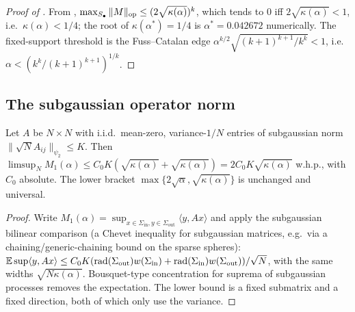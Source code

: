 \begin{proof}[Proof of ]
From , $\max_{S_\bullet}\|M\|_{\mathrm{op}}\le(2\sqrt{\kappa(\alpha)})^k$, which tends to $0$ iff
$2\sqrt{\kappa(\alpha)}<1$, i.e.\ $\kappa(\alpha)<1/4$; the root of $\kappa(\alpha^*)=1/4$ is
$\alpha^*=0.042672$ numerically. The fixed-support threshold is the Fuss--Catalan edge
$\alpha^{k/2}\sqrt{(k+1)^{k+1}/k^k}<1$, i.e.\ $\alpha<(k^k/(k+1)^{k+1})^{1/k}$.
\end{proof}

\subsection{The subgaussian operator norm}
\begin{lemma}\label{lem:subg}
Let $A$ be $N\times N$ with i.i.d.\ mean-zero, variance-$1/N$ entries of subgaussian norm $\|\sqrt N A_{ij}\|_{\psi_2}\le K$.
Then $\limsup_N M_1(\alpha)\le C_0K(\sqrt{\kappa(\alpha)}+\sqrt{\kappa(\alpha)})=2C_0K\sqrt{\kappa(\alpha)}$
w.h.p., with $C_0$ absolute. The lower bracket $\max\{2\sqrt\alpha,\sqrt{\kappa(\alpha)}\}$ is unchanged
and universal.
\end{lemma}
\begin{proof}
Write $M_1(\alpha)=\sup_{x\in\Sigma_{\mathrm{in}},y\in\Sigma_{\mathrm{out}}}\langle y,Ax\rangle$ and apply
the subgaussian bilinear comparison (a Chevet inequality for subgaussian matrices, e.g.\ via a
chaining/generic-chaining bound on the sparse spheres): $\mathbb{E}\sup\langle y,Ax\rangle\le C_0K(\mathrm{rad}(\Sigma_{\mathrm{out}})w(\Sigma_{\mathrm{in}})+\mathrm{rad}(\Sigma_{\mathrm{in}})w(\Sigma_{\mathrm{out}}))/\sqrt N$,
with the same widths $\sqrt{N\kappa(\alpha)}$. Bousquet-type concentration for suprema of subgaussian
processes removes the expectation. The lower bound is a fixed submatrix and a fixed direction, both of
which only use the variance.
\end{proof}

